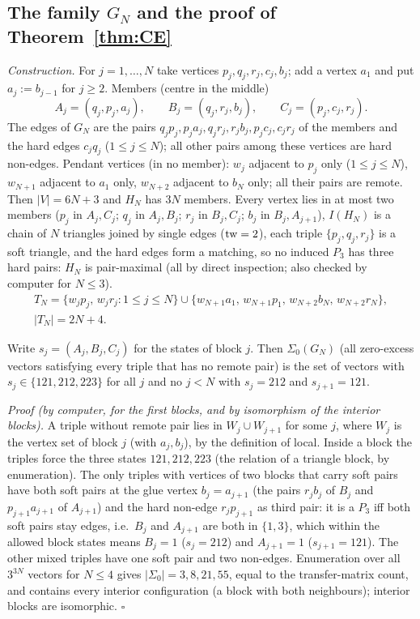 \subsection{The family \texorpdfstring{$G_N$}{G\_N} and the proof of Theorem~\ref{thm:CE}}\label{app:softCE}
\emph{Construction.} For $j=1,\dots,N$ take vertices $p_j,q_j,r_j,c_j,b_j$; add a vertex $a_1$ and put $a_j:=b_{j-1}$ for $j\ge2$. Members (centre in the middle)
\[A_j=(q_j,p_j,a_j),\qquad B_j=(q_j,r_j,b_j),\qquad C_j=(p_j,c_j,r_j).\]
The edges of $G_N$ are the pairs $q_jp_j,p_ja_j,q_jr_j,r_jb_j,p_jc_j,c_jr_j$ of the members and the hard edges $c_jq_j$ ($1\le j\le N$); all other pairs among these vertices are hard non-edges. Pendant vertices (in no member): $w_j$ adjacent to $p_j$ only ($1\le j\le N$), $w_{N+1}$ adjacent to $a_1$ only, $w_{N+2}$ adjacent to $b_N$ only; all their pairs are remote. Then $|V|=6N+3$ and $H_N$ has $3N$ members. Every vertex lies in at most two members ($p_j$ in $A_j,C_j$; $q_j$ in $A_j,B_j$; $r_j$ in $B_j,C_j$; $b_j$ in $B_j,A_{j+1}$), $I(H_N)$ is a chain of $N$ triangles joined by single edges ($\mathrm{tw}=2$), each triple $\{p_j,q_j,r_j\}$ is a soft triangle, and the hard edges form a matching, so no induced $P_3$ has three hard pairs: $H_N$ is pair-maximal (all by direct inspection; also checked by computer for $N\le3$).
\[\begin{gathered}T_N=\{w_jp_j,\,w_jr_j:1\le j\le N\}\cup\{w_{N+1}a_1,\,w_{N+1}p_1,\,w_{N+2}b_N,\,w_{N+2}r_N\},\\ |T_N|=2N+4.\end{gathered}\]

\begin{lemma}[Structure]\label{lem:GN}
Write $s_j=(A_j,B_j,C_j)$ for the states of block $j$. Then $\Sigma_0(G_N)$ (all zero-excess vectors satisfying every triple that has no remote pair) is the set of vectors with $s_j\in\{121,212,223\}$ for all $j$ and no $j<N$ with $s_j=212$ and $s_{j+1}=121$.
\end{lemma}
\emph{Proof (by computer, for the first blocks, and by isomorphism of the interior blocks).} A triple without remote pair lies in $W_j\cup W_{j+1}$ for some $j$, where $W_j$ is the vertex set of block $j$ (with $a_j,b_j$), by the definition of local. Inside a block the triples force the three states $121,212,223$ (the relation of a triangle block, by enumeration). The only triples with vertices of two blocks that carry soft pairs have both soft pairs at the glue vertex $b_j=a_{j+1}$ (the pairs $r_jb_j$ of $B_j$ and $p_{j+1}a_{j+1}$ of $A_{j+1}$) and the hard non-edge $r_jp_{j+1}$ as third pair: it is a $P_3$ iff both soft pairs stay edges, i.e.\ $B_j$ and $A_{j+1}$ are both in $\{1,3\}$, which within the allowed block states means $B_j=1$ ($s_j=212$) and $A_{j+1}=1$ ($s_{j+1}=121$). The other mixed triples have one soft pair and two non-edges. Enumeration over all $3^{3N}$ vectors for $N\le4$ gives $|\Sigma_0|=3,8,21,55$, equal to the transfer-matrix count, and contains every interior configuration (a block with both neighbours); interior blocks are isomorphic. \hfill$\square$

